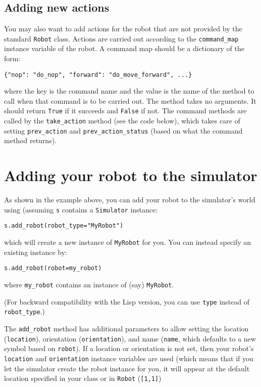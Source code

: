 \documentclass[11pt]{tufte-handout}
\begin{document}
\subsection{Adding new actions}
\label{sec:orgff8d009}

You may also want to add actions for the robot that are not provided by the standard \texttt{Robot} class.  Actions are carried out according to the \texttt{command\_map} instance variable of the robot.  A command map should be a dictionary of the form: 
\begin{verbatim}
{"nop": "do_nop", "forward": "do_move_forward", ...}
\end{verbatim}

\noindent where the key is the command name and the value is the name of the method to call when that command is to be carried out.  The method takes no arguments. It should return \texttt{True} if it succeeds and \texttt{False} if not.  The command methods are called by the \texttt{take\_action} method (see the code below), which takes care of setting \texttt{prev\_action} and \texttt{prev\_action\_status} (based on what the command method returns).

\section{Adding your robot to the simulator}
\label{sec:orgd67b18a}

As shown in the example above, you can add your robot to the simulator's world using (assuming \texttt{s} contains a \texttt{Simulator} instance:
\begin{verbatim}
s.add_robot(robot_type="MyRobot")
\end{verbatim}

\noindent which will create a new instance of \texttt{MyRobot} for you.  You can instead specify an existing instance by:
\begin{verbatim}
s.add_robot(robot=my_robot)
\end{verbatim}

\noindent where \texttt{my\_robot} contains an instance of (say) \texttt{MyRobot}.

(For backward compatibility with the Lisp version, you can use \texttt{type} instead of \texttt{robot\_type}.)

The \texttt{add\_robot} method has additional parameters to allow setting the location (\texttt{location}), orientation (\texttt{orientation}), and name (\texttt{name}, which defaults to a new symbol based on \texttt{robot}).  If a location or orientation is not set, then your robot's \texttt{location} and \texttt{orientation} instance variables are used (which means that if you let the simulator create the robot instance for you, it will appear at the default location specified in your class or in \texttt{Robot} (\texttt{[1,1]})
\end{document}

